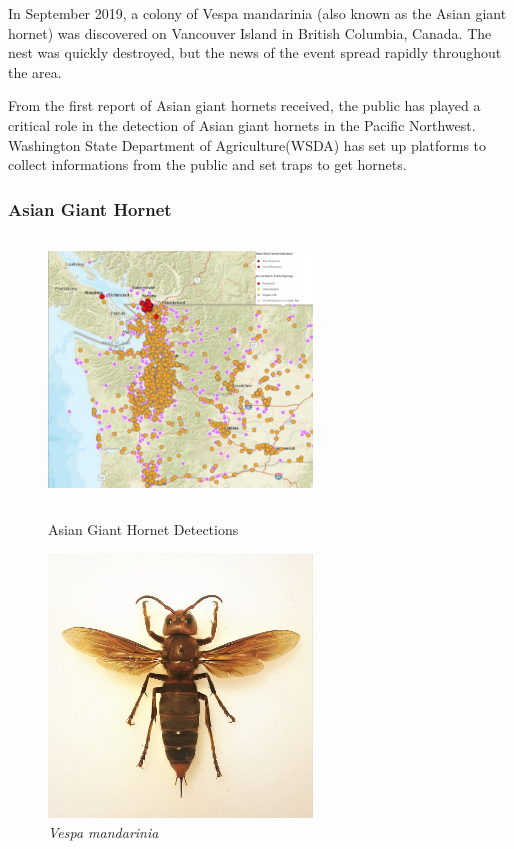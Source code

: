 \documentclass[12pt]{article}
\begin{document}
In September 2019, a colony of Vespa mandarinia (also known as the Asian giant hornet) was discovered on Vancouver Island in British Columbia, Canada. The nest was quickly destroyed, but the news of the event spread rapidly throughout the area. 

From the first report of Asian giant hornets received, the public has played a critical role in the detection of Asian giant hornets in the Pacific Northwest. Washington State Department of Agriculture(WSDA)  has set up platforms\cite{fb} to collect informations from the  public and set traps to get hornets.  
 
\subsubsection{Asian Giant Hornet  }
\begin{figure}[!htbp]
	\small
	\centering
	\begin{minipage}{8cm}
		\includegraphics[width=7cm,height=7cm]{./pictures/dist0.png}
		\caption{ Asian Giant Hornet Detections\cite{website}}\label{nt}
	\end{minipage}
	\begin{minipage}{8cm}
		\includegraphics[width=7cm,height=7cm]{./pictures/wikiintro.jpg}
		\caption{\emph{Vespa mandarinia}\cite{wiki}}\label{nt}
	\end{minipage}
	
\end{figure}
\end{document}
